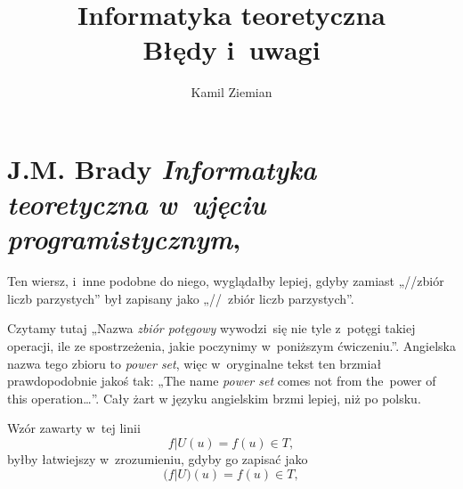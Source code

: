 \documentclass[a4paper,11pt]{article}
\title{Informatyka teoretyczna \\
  {\Large Błędy i~uwagi}}
\author{Kamil Ziemian \\
  \email}
\numberwithin{equation}{section}
\begin{document}





\maketitle





\section{J.M. Brady \textit{Informatyka teoretyczna w~ujęciu
    programistycznym},
  \parencite{Brady-Informatyka-teoretyczna-w-ujeciu-ETC-Pub-1983}}

\label{sec:Brady-Informatyka-teoretyczna-ETC}




\noindent
{} Ten wiersz, i~inne podobne do niego, wyglądałby
lepiej, gdyby zamiast „//zbiór liczb parzystych” był zapisany jako
„//~zbiór liczb parzystych”.

\VerSpaceFour





\noindent
{} Czytamy tutaj „Nazwa \textit{zbiór potęgowy}
wywodzi~się nie tyle z~potęgi takiej operacji, ile ze spostrzeżenia, jakie
poczynimy w~poniższym ćwiczeniu.”. Angielska nazwa tego zbioru to
\textit{power set}, więc w~oryginalne tekst ten brzmiał prawdopodobnie jakoś
tak: „The name \textit{power set} comes not from the~power of this
operation\ldots”. Cały żart w języku angielskim brzmi lepiej, niż po polsku.

\VerSpaceFour





\noindent
{} Wzór zawarty w~tej linii
\begin{equation}
  \label{eq:Brady-Infromatyka-ETC-01}
  f | U ( u ) = f( u ) \in T,
\end{equation}
byłby łatwiejszy w~zrozumieniu, gdyby go zapisać jako
\begin{equation}
  \label{eq:Brady-Infromatyka-ETC-02}
  \big( f | U \big)( u ) = f( u ) \in T,
\end{equation}
\end{document}
